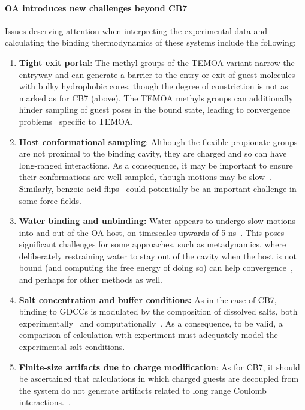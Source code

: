 \documentclass[aps,pre,twocolumn,nofootinbib,superscriptaddress,10pt, final,tightenlines]{revtex4-1}
\begin{document}
\paragraph{OA introduces new challenges beyond CB7} Issues deserving attention when interpreting the experimental data and calculating the binding thermodynamics of these systems include the following:

\begin{enumerate}
\item{{\bf Tight exit portal}: The methyl groups of the TEMOA variant narrow the entryway and can generate a barrier to the entry or exit of guest molecules with bulky hydrophobic cores, though the degree of constriction is not as marked as for CB7 (above). 
The TEMOA methyls groups can additionally hinder sampling of guest poses in the bound state, leading to convergence problems~\cite{yin_sampl5_preprint} specific to TEMOA. }

\item{{\bf Host conformational sampling}: Although the flexible propionate groups are not proximal to the binding cavity, they are charged and so can have long-ranged interactions. 
As a consequence, it may be important to ensure their conformations are well sampled, though motions may be slow~\cite{mikulskis_free-energy_2014}. 
Similarly, benzoic acid flips~\cite{yin_sampl5_2016, tofoleanu_absolute_2016} could potentially be an important challenge in some force fields.}

\item{{\bf Water binding and unbinding:} Water appears to undergo slow motions into and out of the OA host, on timescales upwards of 5 ns~\cite{ewell_water_2008}. 
This poses significant challenges for some approaches, such as metadynamics, where deliberately restraining water to stay out of the cavity when the host is not bound (and computing the free energy of doing so) can help convergence~\cite{bhakat_resolving_2016}, and perhaps for other methods as well.}

\item{{\bf Salt concentration and buffer conditions:} As in the case of CB7, binding to GDCCs is modulated by the composition of dissolved salts, both experimentally~\cite{gibb_anion_2011, sokkalingam_binding_2016} and computationally~\cite{pal_combined_2016, tofoleanu_absolute_2016}. As a consequence, to be valid, a comparison of calculation with experiment must adequately model the experimental salt conditions.
}

\item{{\bf Finite-size artifacts due to charge modification}: As for CB7, it should be ascertained that calculations in which charged guests are decoupled from the system do not generate artifacts related to long range Coulomb interactions.~\cite{rocklin_calculating_2013, lin_overview_2014, reif_net_2014, simonson_concepts_2016}.}


\end{enumerate}
\end{document}
